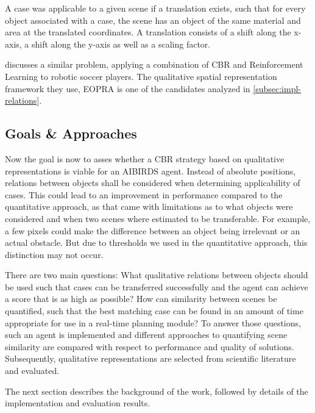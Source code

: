 A case was applicable to a given scene if a translation exists, such that for every object associated with a case, the scene has an object of the same material and area at the translated coordinates. A translation consists of a shift along the x-axis, a shift along the y-axis as well as a scaling factor.


\cite{QCBR} discusses a similar problem, applying a combination of \ac{CBR} and Reinforcement Learning to robotic soccer players.
The qualitative spatial representation framework they use, \ac{EOPRA} is one of the candidates analyzed in \ref{subsec:impl-relations}.



\subsection{Goals \& Approaches}
Now the goal is now to asses whether a \ac{CBR} strategy based on qualitative  representations is viable for an AIBIRDS agent.
Instead of absolute positions, relations between objects shall be considered when determining applicability of cases.
This could lead to an improvement in performance compared to the quantitative approach, as that came with limitations as to what objects were considered and when two scenes where estimated to be transferable. For example, a few pixels could make the difference between an object being irrelevant or an actual obstacle.
But due to thresholds we used in the quantitative approach, this distinction may not occur.

There are two main questions: What qualitative relations between objects should be used such that cases can be transferred successfully and the agent can achieve a score that is as high as possible?
How can similarity between scenes be quantified, such that the best matching case can be found in an amount of time appropriate for use in a real-time planning module?
To answer those questions, such an agent is implemented and different approaches to quantifying scene similarity are compared with respect to performance and quality of solutions. Subsequently, qualitative representations are selected from scientific literature and evaluated.


The next section describes the background of the work, followed by details of the implementation and evaluation results.
